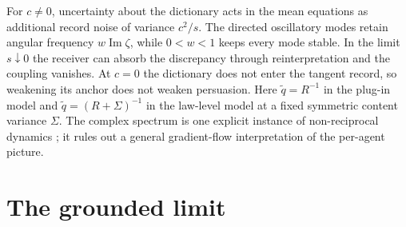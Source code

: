 \documentclass[11pt,letterpaper]{report}
\begin{document}
For $c\neq0$, uncertainty about the dictionary acts in the mean equations as additional record noise of variance $c^2/s$. The directed oscillatory modes retain angular frequency $w\operatorname{Im}\zeta$, while $0<w<1$ keeps every mode stable. In the limit $s\downarrow0$ the receiver can absorb the discrepancy through reinterpretation and the coupling vanishes. At $c=0$ the dictionary does not enter the tangent record, so weakening its anchor does not weaken persuasion. Here $\tilde q=R^{-1}$ in the plug-in model and $\tilde q=(R+\Sigma)^{-1}$ in the law-level model at a fixed symmetric content variance $\Sigma$. The complex spectrum is one explicit instance of non-reciprocal dynamics \citep{FruchartEtAl2021}; it rules out a general gradient-flow interpretation of the per-agent picture.

\chapter{The grounded limit}
\label{it2:ch-grounded}
\end{document}

